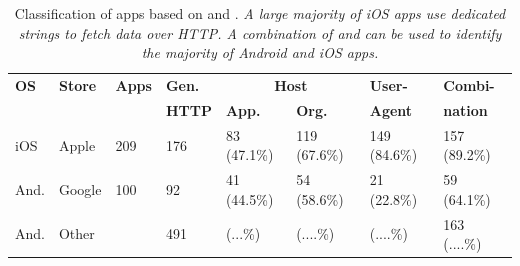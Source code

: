 



\begin{table} 
     \centering
     \begin{small}
     \begin{tabular}{|p{}|p{}|p{}|p{}|p{}|p{}|p{}|p{}|}
        \hline
        {\bf OS}&{\bf Store}&{\bf Apps}&{\bf Gen.}&\multicolumn{2}{|c|}{\bf Host} & {\bf User-}&{\bf Combi-} \tabularnewline
        \cline{5-6}    
             &        &     & {\bf HTTP} & {\bf App. } & {\bf Org.}& \bf{Agent}   & \bf{nation}  \tabularnewline                
        \hline    
        iOS  & Apple  & 209 & 176 & 83 (47.1\%)  &  119 (67.6\%)   &  149 (84.6\%)& 157 (89.2\%) \tabularnewline
        \hline
        And. & Google & 100 & 92  & 41 (44.5\%)  &  54 (58.6\%)    &  21 (22.8\%) &  59 (64.1\%)  \tabularnewline
        \hline    
        And. & Other  & \tbd{} & 491 &  (...\%) &  (....\%)     &  (....\%)  &  163 (....\%)  \tabularnewline
        \hline
     \end{tabular}
     \end{small}
     \caption{Classification of apps based on \httphost and \useragent. \emph{A large majority of iOS apps use dedicated \useragent strings to fetch data over HTTP. A combination of \useragent and \httphost can be used to identify the majority of Android and iOS apps.} }
\vspace{\postfigspace}
     \label{tab:classification-success}
\end{table}

